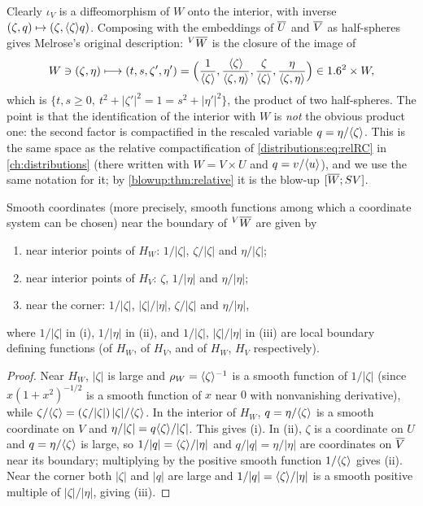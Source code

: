 Clearly $\iota_V$ is a diffeomorphism of $W$ onto the interior, with inverse
$(\zeta,q)\mapsto(\zeta,\langle \zeta\rangle q)$. Composing with the embeddings of $\overline{U}$
and $\overline{V}$ as half-spheres gives Melrose's original description: ${}^{V}\overline{W}$ is the
closure of the image of
\begin{equation*}
W\ni(\zeta,\eta)\longmapsto(t,s,\zeta',\eta')=\Big(\frac1{\langle \zeta\rangle},
\frac{\langle \zeta\rangle}{\langle \zeta,\eta\rangle},\frac\zeta{\langle \zeta\rangle},\frac\eta{\langle \zeta,\eta\rangle}
\Big)\in1.6^2\times W,
\end{equation*}
which is $\{t,s\ge0,\ t^2+|\zeta'|^2=1=s^2+|\eta'|^2\}$, the product of two
half-spheres. The point is that the identification of the interior with $W$ is
\emph{not} the obvious product one: the second factor is compactified in the
rescaled variable $q=\eta/\langle \zeta\rangle$. This is the same space as the relative
compactification of \eqref{distributions:eq:relRC} in \cref{ch:distributions} (there
written with $W=V\times U$ and $q=v/\langle u\rangle$), and we use the same notation for it; by
\cref{blowup:thm:relative} it is the blow-up $[\overline{W};SV]$.

\begin{proposition}\label{product:prop:relative-coords}
Smooth coordinates \textup{(}more precisely, smooth functions among which a
coordinate system can be chosen\textup{)} near the boundary of ${}^{V}\overline{W}$ are
given by
\begin{enumerate}[label=\textup{(\roman*)}]
\item near interior points of $H_W$: $1/|\zeta|$, $\zeta/|\zeta|$ and $\eta/|\zeta|$;
\item near interior points of $H_V$: $\zeta$, $1/|\eta|$ and $\eta/|\eta|$;
\item near the corner: $1/|\zeta|$, $|\zeta|/|\eta|$, $\zeta/|\zeta|$ and
$\eta/|\eta|$,
\end{enumerate}
where $1/|\zeta|$ in \textup{(i)}, $1/|\eta|$ in \textup{(ii)}, and
$1/|\zeta|$, $|\zeta|/|\eta|$ in \textup{(iii)} are local boundary defining
functions \textup{(}of $H_W$, of $H_V$, and of $H_W$, $H_V$
respectively\textup{)}.
\end{proposition}

\begin{proof}
Near $H_W$, $|\zeta|$ is large and $\rho_W=\langle \zeta\rangle^{-1}$ is a smooth function of
$1/|\zeta|$ (since $x(1+x^2)^{-1/2}$ is a smooth function of $x$ near $0$ with
nonvanishing derivative), while $\zeta/\langle \zeta\rangle=(\zeta/|\zeta|)\,|\zeta|/\langle \zeta\rangle$.
In the interior of $H_W$, $q=\eta/\langle \zeta\rangle$ is a smooth coordinate on $V$ and
$\eta/|\zeta|=q\langle \zeta\rangle/|\zeta|$. This gives (i). In (ii), $\zeta$ is a coordinate
on $U$ and $q=\eta/\langle \zeta\rangle$ is large, so $1/|q|=\langle \zeta\rangle/|\eta|$ and
$q/|q|=\eta/|\eta|$ are coordinates on $\overline{V}$ near its boundary; multiplying by
the positive smooth function $1/\langle \zeta\rangle$ gives (ii). Near the corner both
$|\zeta|$ and $|q|$ are large and $1/|q|=\langle \zeta\rangle/|\eta|$ is a smooth positive
multiple of $|\zeta|/|\eta|$, giving (iii).
\end{proof}

